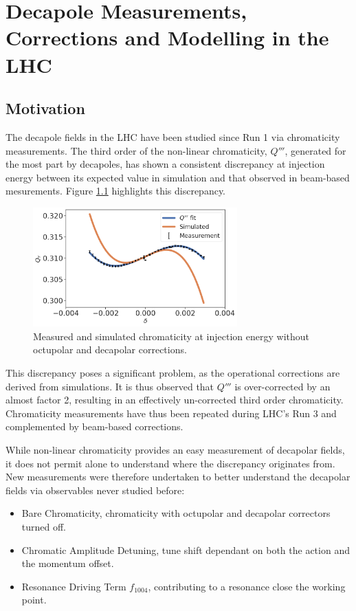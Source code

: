 \chapter{Decapole Measurements, Corrections and Modelling in the LHC}
\thumbforchapter{}
\chaptertoc{}
\newpage

\section{Motivation}

The decapole fields in the LHC have been studied since Run 1 via chromaticity measurements. The
third order of the non-linear chromaticity, $Q'''$, generated for the most part by decapoles, has
shown a consistent discrepancy at injection energy between its expected value in simulation and that
observed in beam-based mesurements.
Figure \ref{fig:decapoles:bare_chroma_vs_simulations} highlights this discrepancy.

\begin{figure}[H]
    \centering
    \captionsetup{justification=centering,margin=2cm}
    \includegraphics[width=0.7\textwidth]{images/bare_chroma_simulated.png}
    \caption{Measured and simulated chromaticity at injection energy without octupolar and
             decapolar corrections.}
    \label{fig:decapoles:bare_chroma_vs_simulations}
\end{figure}

This discrepancy poses a significant problem, as the operational corrections are derived from
simulations. It is thus observed that $Q'''$ is over-corrected by an almost factor 2, resulting in
an effectively un-corrected third order chromaticity.
Chromaticity measurements have thus been repeated during LHC's Run 3 and complemented by beam-based
corrections.

While non-linear chromaticity provides an easy measurement of decapolar fields, it does not permit
alone to understand where the discrepancy originates from. 
New measurements were therefore undertaken to better understand the decapolar fields via observables
never studied before:
\begin{itemize}
    \tightlist
    \item Bare Chromaticity, chromaticity with octupolar and decapolar correctors turned off.
    \item Chromatic Amplitude Detuning, tune shift dependant on both the action and the momentum 
    offset.
    \item Resonance Driving Term $f_{1004}$, contributing to a resonance close the working point.
\end{itemize}



